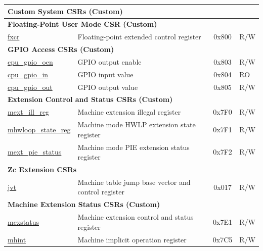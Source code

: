 \begin{longtable}{ | p{4.0cm} | p{8.4cm} | c | l | }
\multicolumn{4}{|l|}{\textbf{Custom System CSRs (Custom)}} \\\hline
\multicolumn{4}{|l|}{\textbf{Floating-Point User Mode CSR (Custom)}} \\\hline
\hyperref[regdesc:FXCR]{fxcr} & Floating-point extended control register & 0x800 & R/W \\\hline
\multicolumn{4}{|l|}{\textbf{GPIO Access CSRs (Custom)}} \\\hline
\hyperref[regdesc:GPIO_OEN]{cpu\_gpio\_oen} & GPIO output enable & 0x803 & R/W \\\hline
\hyperref[regdesc:GPIO_IN]{cpu\_gpio\_in} & GPIO input value & 0x804 & RO \\\hline
\hyperref[regdesc:GPIO_OUT]{cpu\_gpio\_out} & GPIO output value & 0x805 & R/W \\\hline
\multicolumn{4}{|l|}{\textbf{Extension Control and Status CSRs (Custom)}} \\\hline
\hyperref[sec:riscvcpu-hwloop-reg-desc]{mext\_ill\_reg} & Machine extension illegal register & 0x7F0 & R/W \\\hline
\hyperref[sec:riscvcpu-hwloop-reg-desc]{mhwloop\_state\_reg} & Machine mode HWLP extension state register & 0x7F1 & R/W \\\hline
\hyperref[regdesc:MEXT_PIE_STATUS]{mext\_pie\_status} & Machine mode PIE extension status register & 0x7F2 & R/W \\\hline

\multicolumn{4}{|l|}{\textbf{Zc Extension CSRs}} \\\hline
\hyperref[regdesc:JVT]{jvt} & Machine table jump base vector and control register  & 0x017 & R/W \\\hline
\multicolumn{4}{|l|}{\textbf{Machine Extension Status CSRs (Custom)}} \\\hline
\hyperref[regdesc:MEXSTATUS]{mexstatus} & Machine extension control and status register & 0x7E1 & R/W \\\hline
\hyperref[regdesc:MHINT]{mhint} & Machine implicit operation register & 0x7C5 & R/W \\\hline


\end{longtable}
